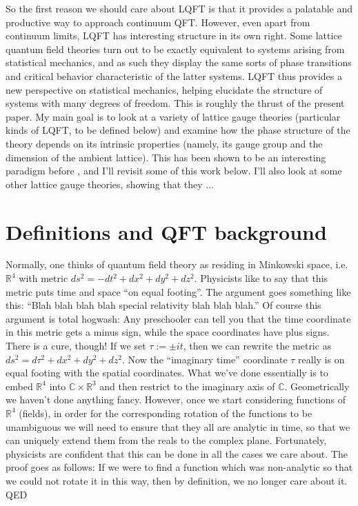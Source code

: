 \documentclass[9pt,twocolumn,twoside]{article}
\begin{document}
So the first reason we should care about LQFT is that it provides a palatable and productive way to approach continuum QFT.  However, even apart from continuum limits, LQFT has interesting structure in its own right.  Some lattice quantum field theories turn out to be exactly equivalent to systems arising from statistical mechanics, and as such they display the same sorts of phase transitions and critical behavior characteristic of the latter systems.  LQFT thus provides a new perspective on statistical mechanics, helping elucidate the structure of systems with many degrees of freedom.  This is roughly the thrust of the present paper.  My main goal is to look at a variety of lattice gauge theories (particular kinds of LQFT, to be defined below) and examine how the phase structure of the theory depends on its intrinsic properties (namely, its gauge group and the dimension of the ambient lattice).  This has been shown to be an interesting paradigm before \cite{Creutz,DAdda}, and I'll revisit some of this work below.  I'll also look at some other lattice gauge theories, showing that they ...

\section{Definitions and QFT background}
Normally, one thinks of quantum field theory as residing in Minkowski space, i.e. $\mathbb{R}^4$ with metric $ds^2 = -dt^2 + dx^2 + dy^2 + dz^2$.  Physicists like to say that this metric puts time and space ``on equal footing''.  The argument goes something like this: ``Blah blah blah blah special relativity blah blah blah.''  Of course this argument is total hogwash: Any preschooler can tell you that the time coordinate in this metric gets a minus sign, while the space coordinates have plus signs.  There is a cure, though!  If we set $\tau := \pm i t$, then we can rewrite the metric as $ds^2 = d\tau^2 + dx^2 + dy^2 + dz^2$.  Now the ``imaginary time'' coordinate $\tau$ really is on equal footing with the spatial coordinates.  What we've done essentially is to embed $\mathbb{R}^4$ into $\mathbb{C}\times \mathbb{R}^3$ and then restrict to the imaginary axis of $\mathbb{C}$.  Geometrically we haven't done anything fancy.  However, once we start considering functions of $\mathbb{R}^4$ (fields), in order for the corresponding rotation of the functions to be unambiguous we will need to ensure that they all are analytic in time, so that we can uniquely extend them from the reals to the complex plane.  Fortunately, physicists are confident that this can be done in all the cases we care about.  The proof goes as follows: If we were to find a function which was non-analytic so that we could not rotate it in this way, then by definition, we no longer care about it.  QED
\end{document}
